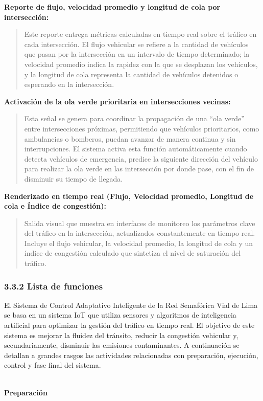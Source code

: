 \documentclass[12pt,a4paper,oneside]{report}
\providecommand{\texorpdfstring}[2]{#1}
\begin{document}
\textbf{Reporte de flujo, velocidad promedio y longitud de cola por intersección:}

\begin{quote}
Este reporte entrega métricas calculadas en tiempo real sobre el tráfico en cada intersección. El flujo vehicular se refiere a la cantidad de vehículos que pasan por la intersección en un intervalo de tiempo determinado; la velocidad promedio indica la rapidez con la que se desplazan los vehículos, y la longitud de cola representa la cantidad de vehículos detenidos o esperando en la intersección.
\end{quote}

\textbf{Activación de la ola verde prioritaria en intersecciones vecinas:}

\begin{quote}
Esta señal se genera para coordinar la propagación de una ``ola verde'' entre intersecciones próximas, permitiendo que vehículos prioritarios, como ambulancias o bomberos, puedan avanzar de manera continua y sin interrupciones. El sistema activa esta función automáticamente cuando detecta vehículos de emergencia, predice la siguiente dirección del vehículo para realizar la ola verde en las intersección por donde pase, con el fin de disminuir su tiempo de llegada.
\end{quote}

\textbf{Renderizado en tiempo real (Flujo, Velocidad promedio, Longitud de cola e Índice de congestión):}

\begin{quote}
Salida visual que muestra en interfaces de monitoreo los parámetros clave del tráfico en la intersección, actualizados constantemente en tiempo real. Incluye el flujo vehicular, la velocidad promedio, la longitud de cola y un índice de congestión calculado que sintetiza el nivel de saturación del tráfico.
\end{quote}

\subsubsection{\texorpdfstring{3.3.2 Lista de funciones\\
}{3.3.2 Lista de funciones }}\label{lista-de-funciones}

El Sistema de Control Adaptativo Inteligente de la Red Semafórica Vial de Lima se basa en un sistema IoT que utiliza sensores y algoritmos de inteligencia artificial para optimizar la gestión del tráfico en tiempo real. El objetivo de este sistema es mejorar la fluidez del tránsito, reducir la congestión vehicular y, secundariamente, disminuir las emisiones contaminantes. A continuación se detallan a grandes rasgos las actividades relacionadas con preparación, ejecución, control y fase final del sistema.\\
\strut \\
\textbf{Preparación}
\end{document}
